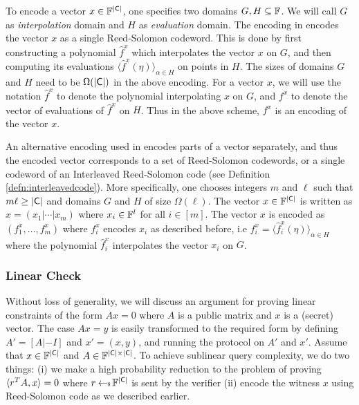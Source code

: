 To encode a vector $x\in \mathbb{F}^{\mathsf{|C|}}$, one specifies two domains $G,H\subseteq \mathbb{F}$. We will call $G$ as {\em interpolation} domain and $H$ as {\em evaluation} domain. The encoding in \cite{Aurora} encodes the vector $x$ as a single Reed-Solomon codeword. This is done by first constructing a polynomial $\hat{f}^x$ which interpolates the vector $x$ on $G$, and then computing its evaluations $\langle \hat{f}^x(\eta) \rangle_{\alpha\in H}$ on points in $H$. The sizes of domains $G$ and $H$ need to be $\Omega(\mathsf{|C|})$ in the above encoding. For a vector $x$, we will use the notation $\hat{f}^x$ to denote the polynomial interpolating $x$ on $G$, and $f^x$ to denote the vector of evaluations of $\hat{f}^x$ on $H$. Thus in the above scheme, $f^x$ is an encoding of the vector $x$.

An alternative encoding used in \cite{Ligero} encodes parts of a vector separately, and thus the encoded vector corresponds to a set of Reed-Solomon codewords, or a single codeword of an Interleaved Reed-Solomon code (see Definition \ref{defn:interleavedcode}). More specifically, one chooses integers $m$ and $\ell$ such that $m\ell \geq \mathsf{|C|}$ and domains $G$ and $H$ of size $\Omega(\ell)$. The vector $x\in \mathbb{F}^{\mathsf{|C|}}$ is written as
$x=(x_1|\cdots|x_m)$ where $x_i\in \mathbb{F}^l$ for all $i\in [m]$. The vector $x$ is encoded as $(f^x_1,\ldots,f^x_m)$ where $f^x_i$ encodes $x_i$ as described before, i.e $f^x_i=\langle \hat{f}^x_i(\eta)\rangle_{\alpha\in H}$ where the polynomial $\hat{f}^x_i$ interpolates the vector $x_i$ on $G$. 

\subsubsection{Linear Check}
	Without loss of generality, we will discuss an argument for proving linear constraints of the form $Ax=0$ where $A$ is a public matrix and $x$ is a (secret) vector. The case $Ax=y$ is easily transformed to the required form by defining $A'=[A|-I]$ and $x'=(x,y)$, and running the protocol on $A'$ and $x'$. Assume that $x\in \mathbb{F}^{\mathsf{|C|}}$ and $A\in \mathbb{F}^{\mathsf{|C|}\times \mathsf{|C|}}$. To achieve sublinear query complexity, we do two things: (i) we make a high probability reduction to the problem of proving $\langle r^TA,x\rangle=0$ where $r\hskip2.3pt{\gets\!\!\mbox{\tiny${\$}$\normalsize}}\, \mathbb{F}^{\mathsf{|C|}}$ is sent by the verifier (ii) encode the witness $x$ using Reed-Solomon code as we described earlier.
	
